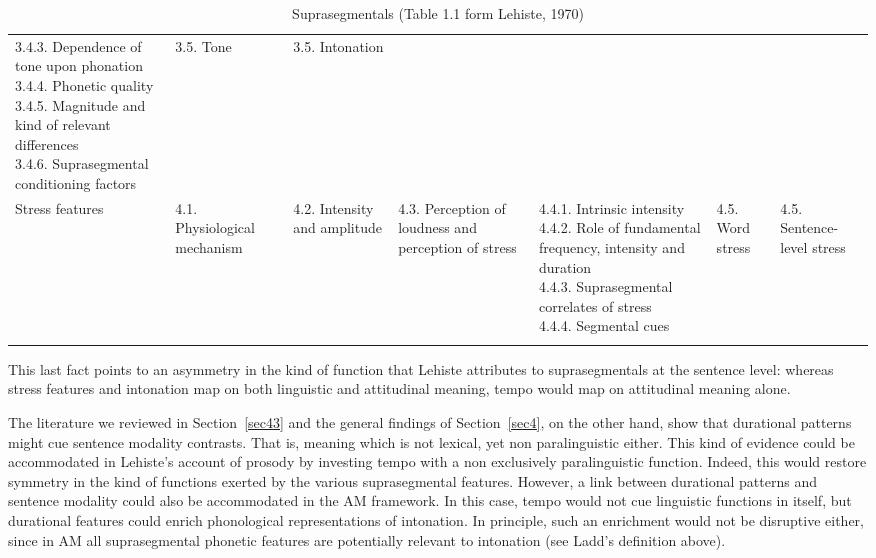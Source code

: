 \begin{landscape}
\begin{table}[p]
\begin{tabular}{lp{1.8cm}p{3cm}p{1.7cm}llp{2cm}}
{														    3.4.3. Dependence of tone upon phonation \\
														    3.4.4. Phonetic quality  \\
														    3.4.5. Magnitude and kind of relevant differences\\
														    3.4.6. Suprasegmental conditioning factors \\
														    }
		    & {3.5. Tone} & {3.5. Intonation} \\
{Stress features} & {4.1. Physiological mechanism} & {4.2. Intensity and amplitude} & {4.3. Perception of loudness and perception of stress} & \parbox[t]{3cm}{4.4.1. Intrinsic intensity \\
				      4.4.2. Role of fundamental frequency, intensity and duration\\
				      4.4.3. Suprasegmental correlates of stress\\
				      4.4.4. Segmental cues\\
				      }
				      & {4.5. Word stress} & {4.5. Sentence-level stress} \\
				      \mybottomrule
\end{tabular}
\caption{Suprasegmentals (Table 1.1 form Lehiste, 1970)}
\label{tab51}\end{table}
\end{landscape}
\fussy 

This last fact points to an asymmetry in the kind of function that Lehiste attributes to suprasegmentals at the sentence level: whereas stress features and intonation map on both linguistic and attitudinal meaning, tempo would map on attitudinal meaning alone. 

The literature we reviewed in Section~\ref{sec43} and the general findings of Section~\ref{sec4}, on the other hand, show that durational patterns might cue sentence modality contrasts. That is, meaning which is not lexical, yet non paralinguistic either. This kind of evidence could be accommodated in Lehiste's account of prosody by investing tempo with a non exclusively paralinguistic function. Indeed, this would restore symmetry in the kind of functions exerted by the various suprasegmental features. However, a link between durational patterns and sentence modality could also be accommodated in the AM framework. In this case, tempo would not cue linguistic functions in itself, but durational features could enrich phonological representations of intonation. In principle, such an enrichment would not be disruptive either, since in AM all suprasegmental phonetic features are potentially relevant to intonation (see Ladd's definition above). 


